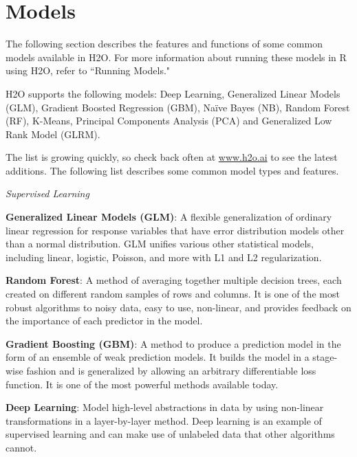\section{Models}

The following section describes the features and functions of some common models available in H2O.  For more information about running these models in R using H2O, refer to ``Running Models." 

H2O supports the following models:  Deep Learning, Generalized Linear Models (GLM), Gradient Boosted Regression (GBM), Na\"{i}ve Bayes (NB), Random Forest (RF), K-Means, Principal Components Analysis (PCA) and Generalized Low Rank Model (GLRM).

The list is growing quickly, so check back often at \url{www.h2o.ai} to see the latest additions. The following list describes some common model types and features. 

{\textit{Supervised Learning}}

{\textbf{Generalized Linear Models (GLM)}}: A flexible generalization of ordinary linear regression for response variables that have error distribution models other than a normal distribution. GLM unifies various other statistical models, including linear, logistic, Poisson, and more with L1 and L2 regularization.

{\textbf{Random Forest}}: A method of averaging together multiple decision trees, each created on different random samples of rows and columns. It is one of the most robust algorithms to noisy data, easy to use, non-linear, and provides feedback on the importance of each predictor in the model.

{\textbf{Gradient Boosting (GBM)}}: A method to produce a prediction model in the form of an ensemble of weak prediction models. It builds the model in a stage-wise fashion and is generalized by allowing an arbitrary differentiable loss function. It is one of the most powerful methods available today.

{\textbf{Deep Learning}}: Model high-level abstractions in data by using non-linear transformations in a layer-by-layer method. Deep learning is an example of supervised learning and can make use of unlabeled data that other algorithms cannot.

